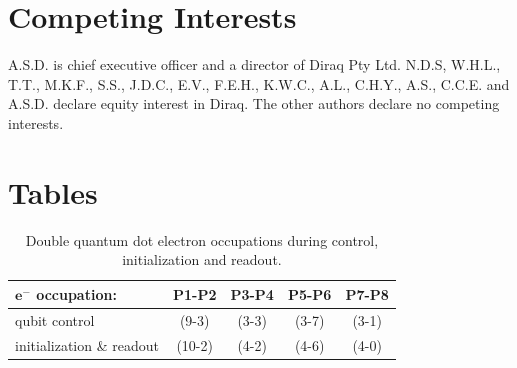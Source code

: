 \documentclass[superscriptaddress,twocolumn,10pt,prl,floatfix,nofootinbib,aps]{revtex4-2}
\newif\ifpreprint
\begin{document}
\section{Competing Interests}
\noindent 
A.S.D. is chief executive officer and a director of Diraq Pty Ltd. N.D.S,
W.H.L., T.T., M.K.F., S.S., J.D.C., E.V., F.E.H., K.W.C., A.L., C.H.Y., A.S., C.C.E. and A.S.D. declare
equity interest in Diraq. The other authors declare no competing interests.



\ifpreprint %

\FloatBarrier
\clearpage
\onecolumngrid
\appendix

\twocolumngrid
\clearpage

\else %

\FloatBarrier
\clearpage
\onecolumngrid
\section{Tables}
\begin{table}[H]
\centering
    \begin{tabular}{|l|c|c|c|c|}
    \hline
    \textbf{$\mathbf{e^-}$ occupation:} & \textbf{P1-P2} & \textbf{P3-P4} & \textbf{P5-P6} & \textbf{P7-P8} \\
    \hline
    
    qubit control        & (9-3) & (3-3) & (3-7) & (3-1) \\
    initialization \& readout & (10-2) & (4-2) & (4-6) & (4-0) \\
    \hline
    \end{tabular}
\caption{
    Double quantum dot electron occupations during control, initialization and readout. \label{tab:e_occupations}
}
\end{table}
\end{document}
